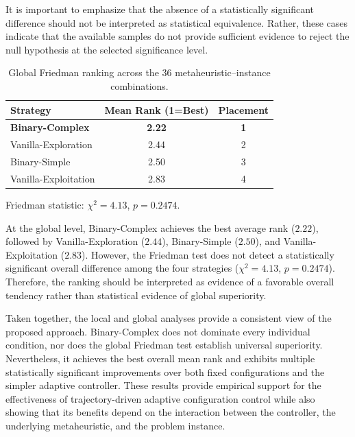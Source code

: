 \documentclass[journal,article,submit,moreauthors]{Definitions/mdpi}
\begin{document}
It is important to emphasize that the absence of a statistically significant
difference should not be interpreted as statistical equivalence. Rather,
these cases indicate that the available samples do not provide sufficient
evidence to reject the null hypothesis at the selected significance level.

\begin{table}[htbp]
  \centering
  \caption{Global Friedman ranking across the 36
  metaheuristic--instance combinations.}
  \label{tab:friedman_ranking}
  \begin{tabular}{lcc}
    \toprule
    \textbf{Strategy} &
    \textbf{Mean Rank (1=Best)} &
    \textbf{Placement} \\
    \midrule
    \textbf{Binary-Complex} & \textbf{2.22} & \textbf{1} \\
    Vanilla-Exploration     & 2.44 & 2 \\
    Binary-Simple           & 2.50 & 3 \\
    Vanilla-Exploitation    & 2.83 & 4 \\
    \bottomrule
  \end{tabular}
  \vspace{1ex}

  \footnotesize Friedman statistic:
  $\chi^2=4.13$, $p=0.2474$.
\end{table}

At the global level, Binary-Complex achieves the best average rank
($2.22$), followed by Vanilla-Exploration ($2.44$), Binary-Simple
($2.50$), and Vanilla-Exploitation ($2.83$). However, the Friedman test
does not detect a statistically significant overall difference among the
four strategies ($\chi^2=4.13$, $p=0.2474$). Therefore, the ranking should
be interpreted as evidence of a favorable overall tendency rather than
statistical evidence of global superiority.

Taken together, the local and global analyses provide a consistent view of
the proposed approach. Binary-Complex does not dominate every individual
condition, nor does the global Friedman test establish universal superiority.
Nevertheless, it achieves the best overall mean rank and exhibits multiple
statistically significant improvements over both fixed configurations and
the simpler adaptive controller. These results provide empirical support
for the effectiveness of trajectory-driven adaptive configuration control
while also showing that its benefits depend on the interaction between the
controller, the underlying metaheuristic, and the problem instance.
\end{document}
